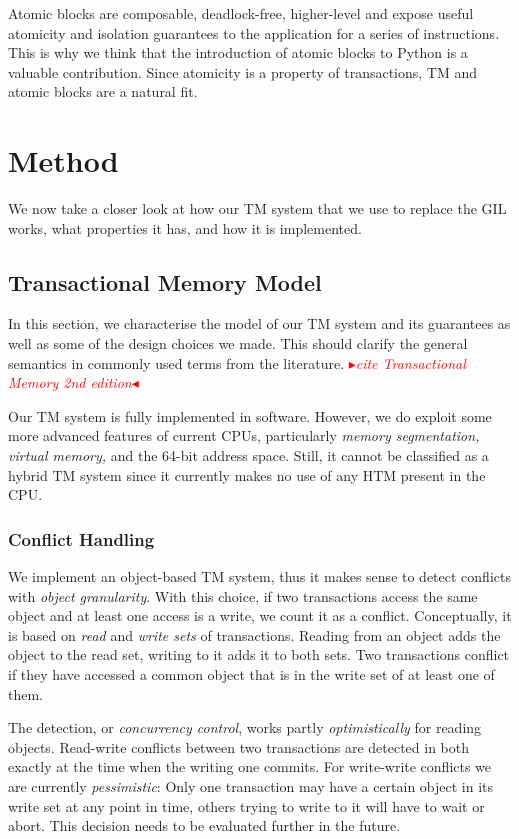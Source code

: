\documentclass{sigplanconf}
\newcommand{\mynote}[2]{%
  \textcolor{red}{%
    \fbox{\bfseries\sffamily\scriptsize#1}%
    {\small$\blacktriangleright$\textsf{\emph{#2}}$\blacktriangleleft$}%
  }%
}
\newcommand\remi[1]{\mynote{Remi}{#1}}
\begin{document}
Atomic blocks are composable, deadlock-free, higher-level and expose
useful atomicity and isolation guarantees to the application for a
series of instructions. This is why we think that the introduction
of atomic blocks to Python is a valuable contribution. Since atomicity
is a property of transactions, TM and atomic blocks are a natural fit.


\section{Method}

We now take a closer look at how our TM system that we use to replace
the GIL works, what properties it has, and how it is implemented.

\subsection{Transactional Memory Model}

In this section, we characterise the model of our TM system and its
guarantees as well as some of the design choices we made. This should
clarify the general semantics in commonly used terms from the
literature.\remi{cite Transactional Memory 2nd edition}

Our TM system is fully implemented in software. However, we do exploit
some more advanced features of current CPUs, particularly \emph{memory
segmentation, virtual memory,} and the 64-bit address space. Still,
it cannot be classified as a hybrid TM system since it currently
makes no use of any HTM present in the CPU.

\subsubsection{Conflict Handling}

We implement an object-based TM system, thus it makes sense to detect
conflicts with \emph{object granularity}. With this choice, if two
transactions access the same object and at least one access is a
write, we count it as a conflict. Conceptually, it is based on
\emph{read} and \emph{write sets} of transactions. Reading from an
object adds the object to the read set, writing to it adds it to both
sets. Two transactions conflict if they have accessed a common object
that is in the write set of at least one of them.

The detection, or \emph{concurrency control}, works partly
\emph{optimistically} for reading objects. Read-write conflicts
between two transactions are detected in both exactly at the time when
the writing one commits. For write-write conflicts we are currently
\emph{pessimistic}: Only one transaction may have a certain object in
its write set at any point in time, others trying to write to it will
have to wait or abort. This decision needs to be evaluated further
in the future.
\end{document}
